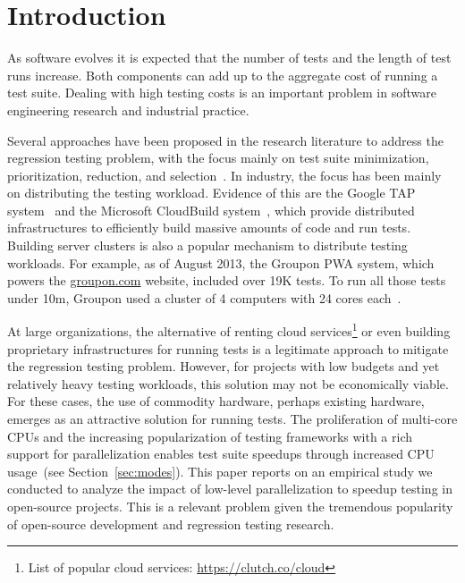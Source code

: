 \section{Introduction}


As software evolves it is expected that the number of tests and the
length of test runs increase.  Both components can add up to the
aggregate cost of running a test suite.  Dealing with high testing
costs is an important problem in software engineering research and
industrial practice.

Several approaches have been proposed in the research literature to
address the regression testing problem, with the focus mainly on test
suite minimization, prioritization, reduction, and
selection~\cite{yoo-harman-stvr2012}.  In industry, the focus has been
mainly on distributing the testing workload.  Evidence of this are the
Google TAP system~\cite{google-tap,google-ci} and the Microsoft
CloudBuild system~\cite{prasad-shulte-ieee-microsoft-ci}, which
provide distributed infrastructures to efficiently build massive
amounts of code and run tests.  Building server clusters is also a
popular mechanism to distribute testing workloads.  For example, as of
August 2013, the Groupon PWA system, which powers the
\url{groupon.com} website, included over 19K tests.  To run all those
tests under 10m, Groupon used a cluster of 4 computers with 24 cores
each~\cite{kim-etal-fse2013}.

At large organizations, the alternative of renting cloud
services\footnote{List of popular cloud services:
  \url{https://clutch.co/cloud}} or even building proprietary
infrastructures for running tests is a legitimate approach to mitigate
the regression testing problem.  However, for projects with low
budgets and yet relatively heavy testing workloads, this solution may
not be economically viable.  For these cases, the use of commodity
hardware, perhaps existing hardware, emerges as an attractive solution
for running tests.  The proliferation of multi-core CPUs and the
increasing popularization of testing frameworks with a rich support
for parallelization enables test suite speedups through increased CPU
usage~(see Section~\ref{sec:modes}).  This paper reports on an
empirical study we conducted to analyze the impact of low-level
parallelization to speedup testing in open-source projects.  This is a
relevant problem given the tremendous popularity of open-source
development and regression testing research.

